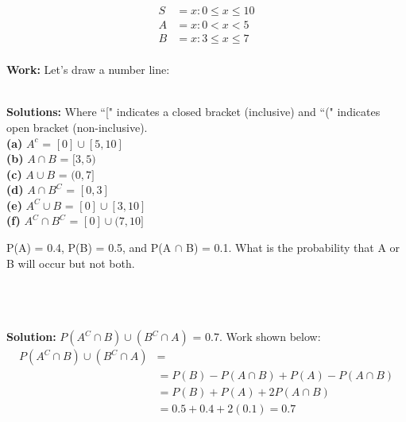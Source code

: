 \documentclass[12pt]{article}
\newenvironment{problem}[2][Problem]{\begin{trivlist}
\item[\hskip \labelsep {\bfseries #1}\hskip \labelsep {\bfseries #2.}]}{\end{trivlist}}
\begin{document}
\begin{problem}{2.2.28}
\begin{align*}
S &= {x:0\leq x \leq 10} \\
A &= {x:0<x<5} \\
B &= {x: 3\leq x\leq 7}\\
\end{align*}


\textbf{Work:} Let's draw a number line:

\\
\textbf{Solutions:} Where ``[" indicates a closed bracket (inclusive) and ``(" indicates open bracket (non-inclusive).\\
\textbf{(a)} $A^c$ = $[0] \cup [5,10] $\\
\textbf{(b)} $A \cap B $ = $[3,5)$ \\
\textbf{(c)} $A \cup B $ = $(0,7]$ \\
\textbf{(d)} $A \cap B^C$ = $[0,3]$  \\
\textbf{(e)} $A^C \cup B$ = $[0] \cup [3,10]$\\
\textbf{(f)} $A^C \cap B^C$ = $[0] \cup (7,10]$
\end{problem}

\begin{problem}{2.3.2} 
P(A) = 0.4, P(B) = 0.5, and P(A $\cap $ B) = 0.1. What is the probability that A or B will occur but not both. \\

\def\firstcircle{(0,0) circle (3)}
\def\secondcircle{(45:4cm) circle (3)}

\\
\\
\\
\textbf{Solution:} $P(A^C \cap B) \cup (B^C \cap A)$ = 0.7. Work shown below:
\begin{align*}
P(A^C \cap B)  \cup (B^C \cap A) &= \\
&=P(B) - P(A \cap B)  + P(A) - P(A \cap B) \\
&=P(B) + P(A) + 2P(A \cap B) \\
&=0.5 + 0.4 + 2(0.1)  = 0.7 \\
\end{align*}
\end{problem}
\end{document}
